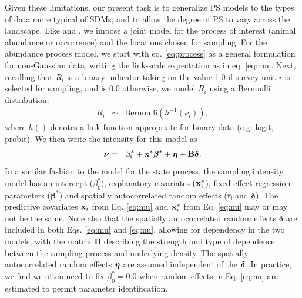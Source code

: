 \documentclass[times,mee,doublespace,]{besauth2}
\begin{document}
Given these limitations, our present task is to generalize PS models to the types of data more typical of SDMs, and to allow the degree of PS to vary across the landscape.  Like \citet{DiggleEtAl2010} and \citet{PatiEtAl2011}, we impose a joint model for the process of interest (animal abundance or occurrence) and the locations chosen for sampling. For the abundance process model, we start with eq. \ref{eq:process} as a general formulation for non-Gaussian data, writing the link-scale expectation as in eq. \ref{eq:mu}.
Next, recalling that $R_i$ is a binary indicator taking on the value 1.0 if survey unit $i$ is selected for sampling, and is 0.0 otherwise, we model $R_i$ using a Bernoulli distribution:
\begin{eqnarray}
 \label{eq:R}
  R_i & \sim & \text{Bernoulli}(h^{-1}(\nu_i)),
\end{eqnarray}
where $h()$ denotes a link function appropriate for binary data (e.g. logit, probit).  We then write the intensity for this model as
\begin{eqnarray}
  \label{eq:nu}
  \boldsymbol{\nu} & = & \beta_0^* + {\bf x}^* \boldsymbol{\beta}^*+\boldsymbol{\eta}+{\bf B} \boldsymbol{\delta}.
\label{eq:nu}
\end{eqnarray}
 In a similar fashion to the model for the state process, the sampling intensity model has an intercept ($\beta_0^*$), explanatory covariates (${\bf x}_i^*$), fixed effect regression parameters ($\boldsymbol{\beta}^*$) and spatially autocorrelated random effects ($\boldsymbol{\eta}$ and $\boldsymbol{\delta}$).  The predictive covariates ${\bf x}_i$ from Eq. \ref{eq:mu} and ${\bf x}_i^*$ from Eq. \ref{eq:nu} may or may not be the same.  Note also that the  spatially autocorrelated random effects $\boldsymbol{\delta}$ are included in both Eqs. \ref{eq:mu} and \ref{eq:nu}, allowing for dependency in the two models, with the matrix {\bf B} describing the strength and type of dependence between the sampling process and underlying density.  The spatially autocorrelated random effects $\boldsymbol{\eta}$ are assumed independent of the $\boldsymbol{\delta}$.  In practice, we find we often need to fix $\beta_0^*=0.0$ when random effects in Eq. \ref{eq:nu} are estimated to permit parameter identification.
\end{document}
